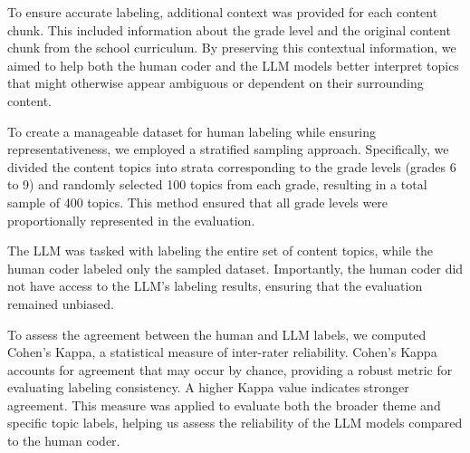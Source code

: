 \documentclass[]{interact}
\theoremstyle{plain}%
\theoremstyle{definition}
\theoremstyle{remark}
\begin{document}
To ensure accurate labeling, additional context was provided for each content chunk. This included information about the grade level and the original content chunk from the school curriculum. By preserving this contextual information, we aimed to help both the human coder and the LLM models better interpret topics that might otherwise appear ambiguous or dependent on their surrounding content.

To create a manageable dataset for human labeling while ensuring representativeness, we employed a stratified sampling approach. Specifically, we divided the content topics into strata corresponding to the grade levels (grades 6 to 9) and randomly selected 100 topics from each grade, resulting in a total sample of 400 topics. This method ensured that all grade levels were proportionally represented in the evaluation.

The LLM was tasked with labeling the entire set of content topics, while the human coder labeled only the sampled dataset. Importantly, the human coder did not have access to the LLM’s labeling results, ensuring that the evaluation remained unbiased.

To assess the agreement between the human and LLM labels, we computed Cohen’s Kappa, a statistical measure of inter-rater reliability. Cohen’s Kappa accounts for agreement that may occur by chance, providing a robust metric for evaluating labeling consistency. A higher Kappa value indicates stronger agreement. This measure was applied to evaluate both the broader theme and specific topic labels, helping us assess the reliability of the LLM models compared to the human coder.





\end{document}

